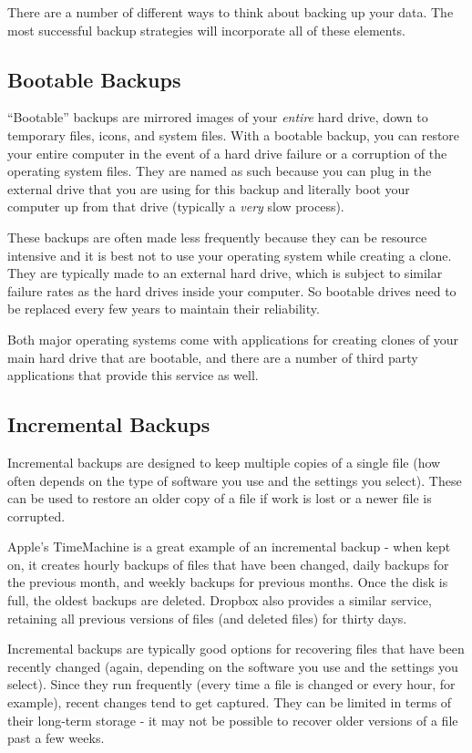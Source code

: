 \documentclass[]{book}
\theoremstyle{definition}
\theoremstyle{definition}
\theoremstyle{definition}
\theoremstyle{remark}
\begin{document}
There are a number of different ways to think about backing up your
data. The most successful backup strategies will incorporate all of
these elements.

\subsection{Bootable Backups}\label{bootable-backups}

``Bootable'' backups are mirrored images of your \emph{entire} hard
drive, down to temporary files, icons, and system files. With a bootable
backup, you can restore your entire computer in the event of a hard
drive failure or a corruption of the operating system files. They are
named as such because you can plug in the external drive that you are
using for this backup and literally boot your computer up from that
drive (typically a \emph{very} slow process).

These backups are often made less frequently because they can be
resource intensive and it is best not to use your operating system while
creating a clone. They are typically made to an external hard drive,
which is subject to similar failure rates as the hard drives inside your
computer. So bootable drives need to be replaced every few years to
maintain their reliability.

Both major operating systems come with applications for creating clones
of your main hard drive that are bootable, and there are a number of
third party applications that provide this service as well.

\subsection{Incremental Backups}\label{incremental-backups}

Incremental backups are designed to keep multiple copies of a single
file (how often depends on the type of software you use and the settings
you select). These can be used to restore an older copy of a file if
work is lost or a newer file is corrupted.

Apple's TimeMachine is a great example of an incremental backup - when
kept on, it creates hourly backups of files that have been changed,
daily backups for the previous month, and weekly backups for previous
months. Once the disk is full, the oldest backups are deleted. Dropbox
also provides a similar service, retaining all previous versions of
files (and deleted files) for thirty days.

Incremental backups are typically good options for recovering files that
have been recently changed (again, depending on the software you use and
the settings you select). Since they run frequently (every time a file
is changed or every hour, for example), recent changes tend to get
captured. They can be limited in terms of their long-term storage - it
may not be possible to recover older versions of a file past a few
weeks.
\end{document}
